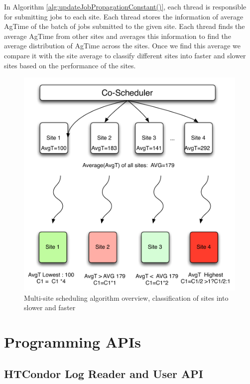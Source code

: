 \documentclass[ms,electronic,double]{nuthesis}
\begin{document}
In Algorithm \ref{alg:updateJobPropagationConstant()}, each thread is responsible for submitting jobs 
to each site. Each thread stores the information of average AgTime of the batch of jobs submitted to the given site.
 Each thread finds the average AgTime from other sites and averages this 
 information to find the average distribution of AgTime across the sites. Once 
 we find this average we compare it with the site average to classify different sites 
into faster and slower sites based on the performance of the sites.

\begin{figure}[htbp!]
\begin{center}
\includegraphics[scale=0.75]{images/multipleSites}
\caption{Multi-site scheduling algorithm overview, classification of sites into slower and faster}
\label{fig:multiSite1}
\end{center}
\end{figure}
\FloatBarrier

\section{Programming APIs}
\subsection{HTCondor Log Reader and User API}
\end{document}
